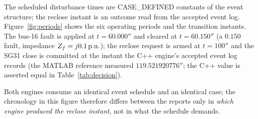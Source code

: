 The scheduled disturbance times are \textsf{CASE\_DEFINED} constants of the
event structure; the reclose instant is an outcome read from the accepted
event log.  Figure~\ref{fig:periods} shows the six operating periods and the
transition instants.  The bus-16 fault is applied at $t=60.000\second$ and
cleared at $t=60.150\second$ (a $0.150$\second fault, impedance
$Z_f=j0.1\pu$); the reclose request is armed at $t=100\second$ and the SG31
close is committed at the instant the C++ engine's accepted event log
records (the MATLAB reference measured $119.521920776\second$; the C++ value
is asserted equal in Table~\ref{tab:decision}).

Both engines consume an identical event schedule and an identical case; the
chronology in this figure therefore differs between the reports only in
\emph{which engine produced the reclose instant}, not in what the schedule
demands.
